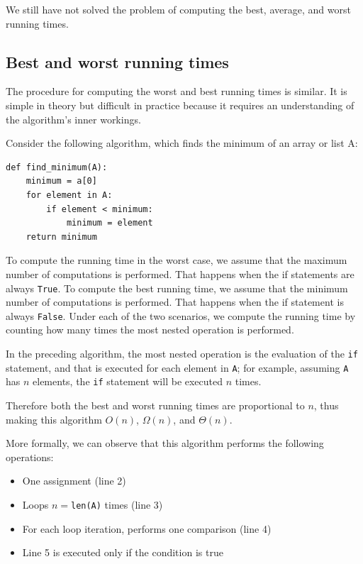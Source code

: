 \documentclass[justified,sixbynine]{tufte-book}
\def\ft{\small\tt}
\theoremstyle{plain}%
\theoremstyle{definition}
\theoremstyle{remark}
\begin{document}
\begin{fullwidth}
We still have not solved the problem of computing the best, average, and worst running times.

\goodbreak\subsection{Best and worst running times}

The procedure for computing the worst and best running times is similar. It is simple in theory but difficult in practice because it requires an understanding of the algorithm's inner workings.

Consider the following algorithm, which finds the minimum of an array or list A:
\begin{lstlisting}
def find_minimum(A):
    minimum = a[0]
    for element in A:
        if element < minimum:
            minimum = element
    return minimum
\end{lstlisting}


To compute the running time in the worst case, we assume that the maximum number of computations is performed. That happens when the if statements are always {\ft True}. To compute the best running time, we assume that the minimum number of computations is performed. That happens when the if statement is always {\ft False}.
Under each of the two scenarios, we compute the running time by counting how many times the most nested operation is performed.

In the preceding algorithm, the most nested operation is the evaluation of the {\ft if} statement, and that is executed for each element in {\ft A}; for example, assuming {\ft A} has $n$ elements, the {\ft if} statement will be executed $n$ times.

Therefore both the best and worst running times are proportional to $n$, thus making this algorithm $O(n)$, $\Omega(n)$, and $\Theta(n)$.

More formally, we can observe that this algorithm performs the following operations:

\begin{itemize}
\item  One assignment (line 2)

\item  Loops $n=${\ft len(A)} times (line 3)

\item  For each loop iteration, performs one comparison (line 4)

\item  Line 5 is executed only if the condition is true
\end{itemize}


\end{fullwidth}
\end{document}
